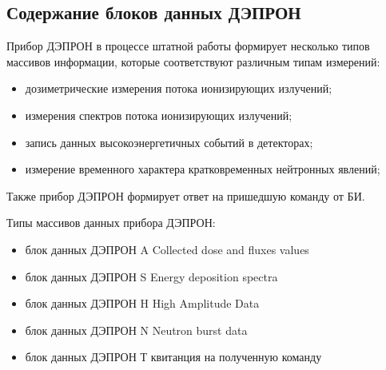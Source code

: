 
\subsection{Содержание блоков данных ДЭПРОН}

Прибор ДЭПРОН в процессе штатной работы формирует несколько типов массивов информации, которые соответствуют различным типам измерений:


\begin{itemize}
	\item 	дозиметрические измерения потока ионизирующих излучений;
	
	
	\item 	измерения спектров потока ионизирующих излучений;
	
	
	\item 	запись данных высокоэнергетичных событий в детекторах;
	
	
	\item 	измерение временного характера кратковременных нейтронных явлений;
	
	
\end{itemize}
Также прибор ДЭПРОН формирует ответ на пришедшую команду от БИ.





Типы массивов данных прибора ДЭПРОН:


\begin{itemize}
	\item 	блок данных ДЭПРОН  A  		Collected dose and fluxes values
	
	
	\item 	блок данных ДЭПРОН  S 		Energy deposition spectra
	
	
	\item 	блок данных ДЭПРОН  H  		High Amplitude Data
	
	
	\item 	блок данных ДЭПРОН  N		Neutron burst data
	
	
	\item 	блок данных ДЭПРОН  Т		квитанция на полученную команду
	

\end{itemize}

